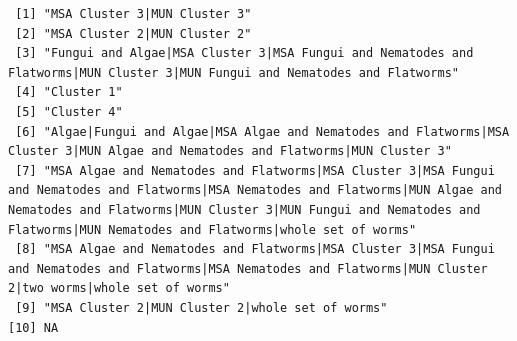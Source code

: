 \documentclass[
  letterpaper,
  DIV=11,
  numbers=noendperiod]{scrreprt}
\begin{document}
\begin{verbatim}
 [1] "MSA Cluster 3|MUN Cluster 3"                                                                                                                                                                                                                                     
 [2] "MSA Cluster 2|MUN Cluster 2"                                                                                                                                                                                                                                     
 [3] "Fungui and Algae|MSA Cluster 3|MSA Fungui and Nematodes and Flatworms|MUN Cluster 3|MUN Fungui and Nematodes and Flatworms"                                                                                                                                      
 [4] "Cluster 1"                                                                                                                                                                                                                                                       
 [5] "Cluster 4"                                                                                                                                                                                                                                                       
 [6] "Algae|Fungui and Algae|MSA Algae and Nematodes and Flatworms|MSA Cluster 3|MUN Algae and Nematodes and Flatworms|MUN Cluster 3"                                                                                                                                  
 [7] "MSA Algae and Nematodes and Flatworms|MSA Cluster 3|MSA Fungui and Nematodes and Flatworms|MSA Nematodes and Flatworms|MUN Algae and Nematodes and Flatworms|MUN Cluster 3|MUN Fungui and Nematodes and Flatworms|MUN Nematodes and Flatworms|whole set of worms"
 [8] "MSA Algae and Nematodes and Flatworms|MSA Cluster 3|MSA Fungui and Nematodes and Flatworms|MSA Nematodes and Flatworms|MUN Cluster 2|two worms|whole set of worms"                                                                                               
 [9] "MSA Cluster 2|MUN Cluster 2|whole set of worms"                                                                                                                                                                                                                  
[10] NA                                                                                                                                                                                                                                                                
\end{verbatim}
\end{document}
